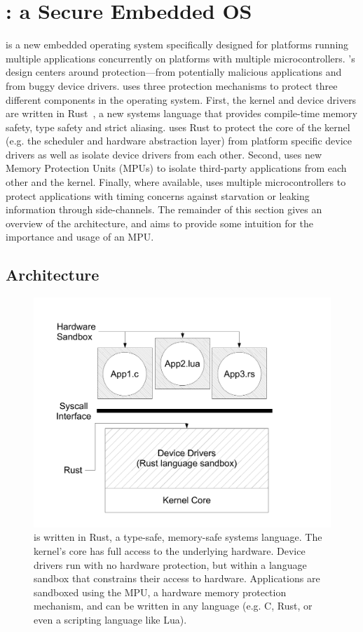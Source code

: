 \section{\name: a Secure Embedded OS}
\label{sec:os}

\name is a new embedded operating system specifically designed for platforms
running multiple applications concurrently on platforms with multiple
microcontrollers. \name's design centers around protection---from potentially
malicious applications and from buggy device drivers. \name uses three
protection mechanisms to protect three different components in the operating
system. First, the kernel and device drivers are written in Rust~\cite{rust}, a
new systems language that provides compile-time memory safety, type safety and
strict aliasing. \name uses Rust to protect the core of the kernel (e.g. the
scheduler and hardware abstraction layer) from platform specific device drivers
as well as isolate device drivers from each other. Second, \name uses new Memory
Protection Units (MPUs) to isolate third-party applications from each other and
the kernel. Finally, where available, \name uses multiple microcontrollers to
protect applications with timing concerns against starvation or leaking
information through side-channels. The remainder of this section gives an
overview of the \name architecture, and aims to provide some intuition for the
importance and usage of an MPU.

\subsection{Architecture}
\label{sec:os-arch}

\begin{figure}
 \centering
\includegraphics[width=1\columnwidth]{img/architecture}
\caption{\name is written in Rust, a type-safe, memory-safe systems language.
The \name kernel's core has full access to the underlying hardware. Device
drivers run with no hardware protection, but within a language sandbox that
constrains their access to hardware. Applications are sandboxed using the MPU, a
hardware memory protection mechanism, and can be written in any language (e.g.
C, Rust, or even a scripting language like Lua).}
\label{fig:architecture}
\end{figure}

